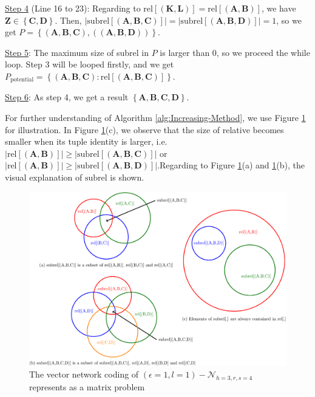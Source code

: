\begin{example}
\uline{Step 4} (Line 16 to 23): Regarding to $\mathrm{rel}\left[\left(\boldsymbol{K},\boldsymbol{L}\right)\right]=\mathrm{rel}\left[\left(\boldsymbol{A},\boldsymbol{B}\right)\right]$,
we have $\boldsymbol{Z}\in\left\{ \boldsymbol{C},\boldsymbol{D}\right\} $.
Then, $\left|\mathrm{subrel}\left[\left(\boldsymbol{A},\boldsymbol{B},\boldsymbol{C}\right)\right]\right|=\left|\mathrm{subrel}\left[\left(\boldsymbol{A},\boldsymbol{B},\boldsymbol{D}\right)\right]\right|=1$,
so we get $P=\left\{ \left(\boldsymbol{A},\boldsymbol{B},\boldsymbol{C}\right),\left(\left(\boldsymbol{A},\boldsymbol{B},\boldsymbol{D}\right)\right)\right\} $.

\uline{Step 5}: The maximum size of subrel in $P$ is larger than
$0$, so we proceed the while loop. Step 3 will be looped firstly,
and we get $P_{\mathrm{potential}}=\left\{ \left(\boldsymbol{A},\boldsymbol{B},\boldsymbol{C}\right):\mathrm{rel}\left[\left(\boldsymbol{A},\boldsymbol{B},\boldsymbol{C}\right)\right]\right\} $.

\uline{Step 6}: As step 4, we get a result $\left\{ \boldsymbol{A},\boldsymbol{B},\boldsymbol{C},\boldsymbol{D}\right\} $.
\end{example}
%
\begin{example}
For further understanding of Algorithm \ref{alg:Increasing-Method},
we use Figure \ref{fig:rel_example} for illustration. In Figure \ref{fig:rel_example}(c),
we observe that the size of relative becomes smaller when its tuple
identity is larger, i.e. $\left|\mathrm{rel}\left[\left(\boldsymbol{A},\boldsymbol{B}\right)\right]\right|\geq\left|\mathrm{subrel}\left[\left(\boldsymbol{A},\boldsymbol{B},\boldsymbol{C}\right)\right]\right|$
or $\left|\mathrm{rel}\left[\left(\boldsymbol{A},\boldsymbol{B}\right)\right]\right|\geq\left|\mathrm{subrel}\left[\left(\boldsymbol{A},\boldsymbol{B},\boldsymbol{D}\right)\right]\right|$.Regarding
to Figure \ref{fig:rel_example}(a) and \ref{fig:rel_example}(b),
the visual explanation of $\mathrm{subrel}$ is shown.
\end{example}
\begin{figure}[H]
\caption{The vector network coding of $(\epsilon=1,l=1)-\mathcal{N}_{h=3,r,s=4}$
represents as a matrix problem\label{fig:rel_example}}

\centering{}\includegraphics[width=0.5\paperwidth]{./figures/rel_example}
\end{figure}

